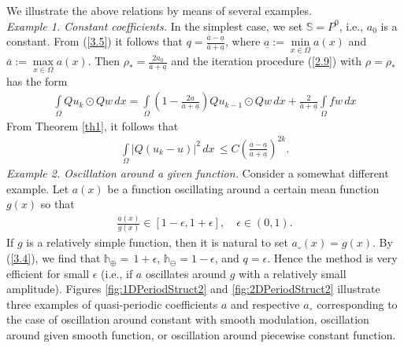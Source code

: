 \documentclass[amstex,amstext,amsfonts,epsf,12pt] {amsart}
\newcommand\be{\begin{eqnarray*}}
\newcommand\ee{\end{eqnarray*}}
\newcommand\ben{\begin{eqnarray}}
\newcommand\een{\end{eqnarray}}
\def\be{\begin{eqnarray*}}
\def\ee{\end{eqnarray*}}
\def\ben{\begin{eqnarray}}
\def\een{\end{eqnarray}}
\def\IntO{\int\limits_\Omega}
\begin{document}
We illustrate the above relations by means of several examples. \\
{\it Example 1. Constant coefficients.}
In the simplest case, we set ${\mathbb S}=P^0$, i.e., $a_0$ is a constant.
From (\ref{3.5}) it follows  that
$q=\displaystyle{
\frac{
\overline{a}-
\underline{a}}
{\overline{a}+
\underline{a}}}$,
where
$\underline{a}:=\min\limits_{x\in \Omega}{a}(x)$
and
$\overline{a}:=\max\limits_{x\in \Omega}{a}(x)$. Then $\rho_*=\frac{2 a_0}{\overline {a}+\underline{a}}$ and the iteration procedure (\ref{2.9})
with $\rho=\rho_*$ has the form
\ben
\label{3.6}
\IntO Qu_k\odot Q w\,dx=
\IntO\left(1-\frac{2a}{\overline {a}+\underline{a}}\right) 
Q u_{k-1}\odot Q w\,dx+\frac{2}{\overline {a}+\underline{a}}\IntO fw\,dx
\een
 From Theorem \ref{th1}, it follows that
\be
\IntO |Q(u_k-u)|^2\,dx\,\leq  C\left(\displaystyle{
\frac{
\overline{a}-
\underline{a}}
{\overline{a}+
\underline{a}}}\right)^{2k}.
\ee
{\it Example 2. Oscillation around a given function.}
Consider a somewhat different example.
Let $a(x)$ be a function
oscillating around a certain mean function $g(x)$ so that 
\be 
\displaystyle\frac{a(x)}{g(x)}\in [1-\epsilon,1+\epsilon],
\quad 
\epsilon\in (0,1).
\ee
 If $g$ is a relatively simple
function, then it is natural to set
$a_\circ(x)=g(x)$. 
By (\ref{3.4}), we find that
$
{\mathds h}_\oplus=\,
1+\epsilon$,
$
{\mathds h}_\ominus=1-\epsilon
$, and $q=\epsilon$.
Hence the method is very efficient for small $\epsilon$
(i.e., if $a$
oscillates around $g$ with a relatively small amplitude).
Figures \ref{fig:1DPeriodStruct2} and \ref{fig:2DPeriodStruct2} illustrate three examples of 
quasi-periodic coefficients  
$a$ and respective $a_\circ$ corresponding to the case of 
oscillation around constant with smooth modulation, 
oscillation around given smooth function, 
or oscillation around piecewise constant function.
\end{document}
